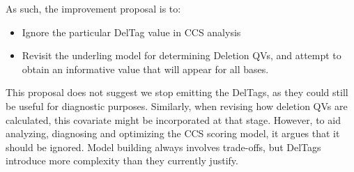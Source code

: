 \documentclass[fleqn,10pt]{SelfArx} %
\begin{document}
As such, the improvement proposal is to:

\begin{itemize}[noitemsep] %
\item Ignore the particular DelTag value in CCS analysis 
\item Revisit the underling model for determining Deletion QVs, and attempt to obtain an informative value that will appear for all bases.  
\end{itemize}
 
This proposal does not suggest we stop emitting the DelTags, as they could still be useful for diagnostic purposes.  Similarly, when revising how deletion QVs are calculated, this covariate might be incorporated at that stage.  However, to aid analyzing, diagnosing and optimizing the CCS scoring model, it argues that it should be ignored. Model building always involves trade-offs, but DelTags introduce more complexity than they currently justify.



\end{document}
